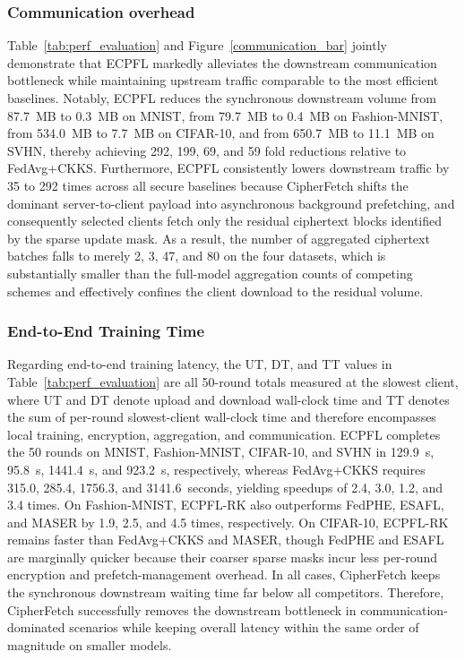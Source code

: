 \subsubsection{Communication overhead}
Table~\ref{tab:perf_evaluation} and Figure~\ref{communication_bar} jointly demonstrate that ECPFL markedly alleviates the downstream communication bottleneck while maintaining upstream traffic comparable to the most efficient baselines.
Notably, ECPFL reduces the synchronous downstream volume from 87.7~MB to 0.3~MB on MNIST, from 79.7~MB to 0.4~MB on Fashion-MNIST, from 534.0~MB to 7.7~MB on CIFAR-10, and from 650.7~MB to 11.1~MB on SVHN, thereby achieving 292, 199, 69, and 59 fold reductions relative to FedAvg+CKKS.
Furthermore, ECPFL consistently lowers downstream traffic by 35 to 292 times across all secure baselines because CipherFetch shifts the dominant server-to-client payload into asynchronous background prefetching, and consequently selected clients fetch only the residual ciphertext blocks identified by the sparse update mask.
As a result, the number of aggregated ciphertext batches falls to merely 2, 3, 47, and 80 on the four datasets, which is substantially smaller than the full-model aggregation counts of competing schemes and effectively confines the client download to the residual volume.

\subsubsection{End-to-End Training Time}
Regarding end-to-end training latency, the UT, DT, and TT values in Table~\ref{tab:perf_evaluation} are all 50-round totals measured at the slowest client, where UT and DT denote upload and download wall-clock time and TT denotes the sum of per-round slowest-client wall-clock time and therefore encompasses local training, encryption, aggregation, and communication.
ECPFL completes the 50 rounds on MNIST, Fashion-MNIST, CIFAR-10, and SVHN in 129.9~s, 95.8~s, 1441.4~s, and 923.2~s, respectively, whereas FedAvg+CKKS requires 315.0, 285.4, 1756.3, and 3141.6~seconds, yielding speedups of 2.4, 3.0, 1.2, and 3.4 times.
On Fashion-MNIST, ECPFL-RK also outperforms FedPHE, ESAFL, and MASER by 1.9, 2.5, and 4.5 times, respectively.
On CIFAR-10, ECPFL-RK remains faster than FedAvg+CKKS and MASER, though FedPHE and ESAFL are marginally quicker because their coarser sparse masks incur less per-round encryption and prefetch-management overhead.
In all cases, CipherFetch keeps the synchronous downstream waiting time far below all competitors.
Therefore, CipherFetch successfully removes the downstream bottleneck in communication-dominated scenarios while keeping overall latency within the same order of magnitude on smaller models.
